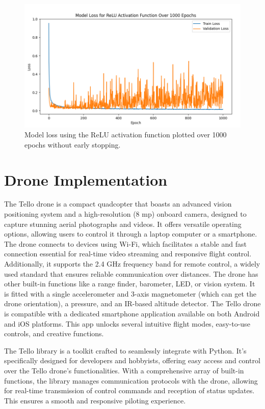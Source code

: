 \begin{figure}[ht!]
	\centering
	\includegraphics[width=\textwidth]{images/model_loss_over_1000_epochs.png}
	\caption{Model loss using the ReLU activation function plotted over 1000 epochs without early stopping.}
	\label{fig:epochs}
\end{figure}



\section{Drone Implementation}

The Tello drone is a compact quadcopter that boasts an advanced vision positioning system and a high-resolution (8 mp) onboard camera, designed to capture stunning aerial photographs and videos. It offers versatile operating options, allowing users to control it through a laptop computer or a smartphone. The drone connects to devices using Wi-Fi, which facilitates a stable and fast connection essential for real-time video streaming and responsive flight control. Additionally, it supports the 2.4 GHz frequency band for remote control, a widely used standard that ensures reliable communication over distances. The drone has other built-in functions like a range finder, barometer, LED, or vision system. It is fitted with a single accelerometer and 3-axis magnetometer (which can get the drone orientation), a pressure, and an IR-based altitude detector. The Tello drone is compatible with a dedicated smartphone application available on both Android and iOS platforms. This app unlocks several intuitive flight modes, easy-to-use controls, and creative functions.

The Tello library is a toolkit crafted to seamlessly integrate with Python. It's specifically designed for developers and hobbyists, offering easy access and control over the Tello drone's functionalities. With a comprehensive array of built-in functions, the library manages communication protocols with the drone, allowing for real-time transmission of control commands and reception of status updates. This ensures a smooth and responsive piloting experience.

